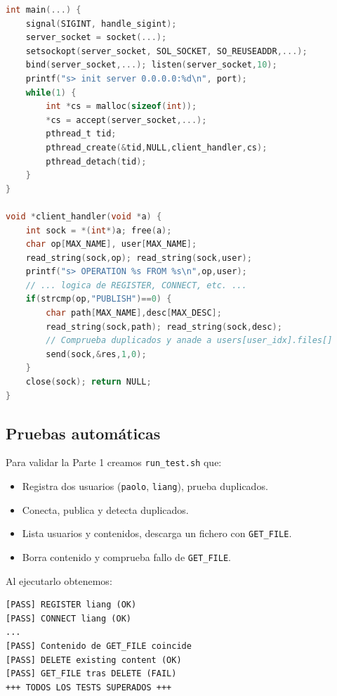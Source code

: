 \documentclass[12pt,a4paper]{article}
\begin{document}
\begin{lstlisting}[language=C,caption={Fragmento de \texttt{server.c}: arranque y PUBLISH},label=lst:server1]
int main(...) {
    signal(SIGINT, handle_sigint);
    server_socket = socket(...);
    setsockopt(server_socket, SOL_SOCKET, SO_REUSEADDR,...);
    bind(server_socket,...); listen(server_socket,10);
    printf("s> init server 0.0.0.0:%d\n", port);
    while(1) {
        int *cs = malloc(sizeof(int));
        *cs = accept(server_socket,...);
        pthread_t tid;
        pthread_create(&tid,NULL,client_handler,cs);
        pthread_detach(tid);
    }
}

void *client_handler(void *a) {
    int sock = *(int*)a; free(a);
    char op[MAX_NAME], user[MAX_NAME];
    read_string(sock,op); read_string(sock,user);
    printf("s> OPERATION %s FROM %s\n",op,user);
    // ... logica de REGISTER, CONNECT, etc. ...
    if(strcmp(op,"PUBLISH")==0) {
        char path[MAX_NAME],desc[MAX_DESC];
        read_string(sock,path); read_string(sock,desc);
        // Comprueba duplicados y anade a users[user_idx].files[]
        send(sock,&res,1,0);
    }
    close(sock); return NULL;
}
\end{lstlisting}

\subsection{Pruebas automáticas}

Para validar la Parte 1 creamos \texttt{run\_test.sh} que:

\begin{itemize}
  \item Registra dos usuarios (\texttt{paolo}, \texttt{liang}), prueba duplicados.
  \item Conecta, publica y detecta duplicados.
  \item Lista usuarios y contenidos, descarga un fichero con \texttt{GET\_FILE}.
  \item Borra contenido y comprueba fallo de \texttt{GET\_FILE}.
\end{itemize}

Al ejecutarlo obtenemos:

\begin{verbatim}
[PASS] REGISTER liang (OK)
[PASS] CONNECT liang (OK)
...
[PASS] Contenido de GET_FILE coincide
[PASS] DELETE existing content (OK)
[PASS] GET_FILE tras DELETE (FAIL)
+++ TODOS LOS TESTS SUPERADOS +++
\end{verbatim}
\end{document}
